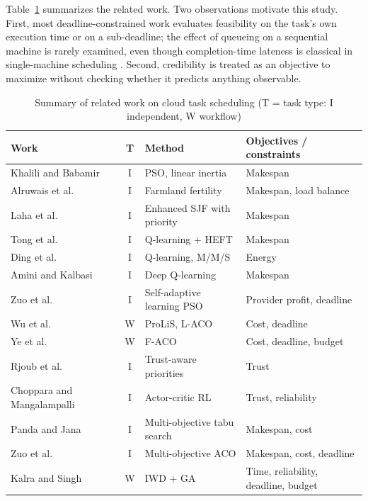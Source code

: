 \documentclass[pdflatex,sn-basic]{sn-jnl}
\theoremstyle{thmstyleone}%
\theoremstyle{thmstyletwo}%
\theoremstyle{thmstylethree}%
\begin{document}
Table~\ref{tab:lit} summarizes the related work. Two observations motivate this study. First, most deadline-constrained work evaluates feasibility on the task's own execution time or on a sub-deadline; the effect of queueing on a sequential machine is rarely examined, even though completion-time lateness is classical in single-machine scheduling \citep{jackson1955}. Second, credibility is treated as an objective to maximize without checking whether it predicts anything observable.

\begin{table}[!t]
\caption{Summary of related work on cloud task scheduling (T = task type: I independent, W workflow)}\label{tab:lit}
\footnotesize
\setlength{\tabcolsep}{3pt}
\begin{tabular}{@{}p{2.9cm}cp{3.0cm}p{3.7cm}@{}}
\toprule
Work & T & Method & Objectives / constraints\\
\midrule
Khalili and Babamir \citeyearpar{khalili2015} & I & PSO, linear inertia & Makespan\\
Alruwais et al.\ \citeyearpar{alruwais2024} & I & Farmland fertility & Makespan, load balance\\
Laha et al.\ \citeyearpar{laha2024} & I & Enhanced SJF with priority & Makespan\\
Tong et al.\ \citeyearpar{tong2020} & I & Q-learning + HEFT & Makespan\\
Ding et al.\ \citeyearpar{ding2020} & I & Q-learning, M/M/S & Energy\\
Amini and Kalbasi \citeyearpar{amini2024} & I & Deep Q-learning & Makespan\\
Zuo et al.\ \citeyearpar{zuo2013} & I & Self-adaptive learning PSO & Provider profit, deadline\\
Wu et al.\ \citeyearpar{wu2017} & W & ProLiS, L-ACO & Cost, deadline\\
Ye et al.\ \citeyearpar{ye2024} & W & F-ACO & Cost, deadline, budget\\
Rjoub et al.\ \citeyearpar{rjoub2020} & I & Trust-aware priorities & Trust\\
Choppara and Mangalampalli \citeyearpar{choppara2024} & I & Actor-critic RL & Trust, reliability\\
Panda and Jana \citeyearpar{panda2015} & I & Multi-objective tabu search & Makespan, cost\\
Zuo et al.\ \citeyearpar{zuo2016} & I & Multi-objective ACO & Makespan, cost, deadline\\
Kalra and Singh \citeyearpar{kalra2019} & W & IWD + GA & Time, reliability, deadline, budget\\

\end{tabular}
\end{table}
\end{document}
